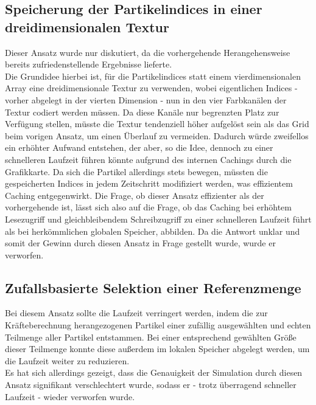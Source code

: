 \subsection{Speicherung der Partikelindices in einer dreidimensionalen Textur}
Dieser Ansatz wurde nur diskutiert, da die vorhergehende Herangehensweise bereits zufriedenstellende Ergebnisse lieferte.\\
Die Grundidee hierbei ist, für die Partikelindices statt einem vierdimensionalen Array eine dreidimensionale Textur zu verwenden, wobei eigentlichen Indices - vorher abgelegt in der vierten Dimension - nun in den vier Farbkanälen der Textur codiert werden müssen. Da diese Kanäle nur begrenzten Platz zur Verfügung stellen, müsste die Textur tendenziell höher aufgelöst sein als das Grid beim vorigen Ansatz, um einen Überlauf zu vermeiden. Dadurch würde zweifellos ein erhöhter Aufwand entstehen, der aber, so die Idee, dennoch zu einer schnelleren Laufzeit führen könnte aufgrund des internen Cachings durch die Grafikkarte. Da sich die Partikel allerdings stets bewegen, müssten die gespeicherten Indices in jedem Zeitschritt modifiziert werden, was effizientem Caching entgegenwirkt. Die Frage, ob dieser Ansatz effizienter als der vorhergehende ist, lässt sich also auf die Frage, ob das Caching bei erhöhtem Lesezugriff und gleichbleibendem Schreibzugriff zu einer schnelleren Laufzeit führt als bei herkömmlichen globalen Speicher, abbilden. Da die Antwort unklar und somit der Gewinn durch diesen Ansatz in Frage gestellt wurde, wurde er verworfen.
\subsection{Zufallsbasierte Selektion einer Referenzmenge}
Bei diesem Ansatz sollte die Laufzeit verringert werden, indem die zur Kräfteberechnung herangezogenen Partikel einer zufällig ausgewählten und echten Teilmenge aller Partikel entstammen. Bei einer entsprechend gewählten Größe dieser Teilmenge konnte diese außerdem im lokalen Speicher abgelegt werden, um die Laufzeit weiter zu reduzieren.\\
Es hat sich allerdings gezeigt, dass die Genauigkeit der Simulation durch diesen Ansatz signifikant verschlechtert wurde, sodass er - trotz überragend schneller Laufzeit - wieder verworfen wurde.
